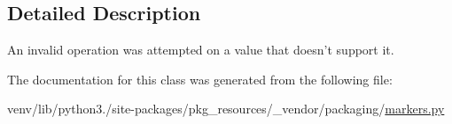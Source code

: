 \subsection{Detailed Description}
\begin{DoxyVerb}An invalid operation was attempted on a value that doesn't support it.
\end{DoxyVerb}
 

The documentation for this class was generated from the following file\+:\begin{DoxyCompactItemize}
\item 
venv/lib/python3./site-\/packages/pkg\+\_\+resources/\+\_\+vendor/packaging/\hyperlink{pkg__resources_2__vendor_2packaging_2markers_8py}{markers.\+py}\end{DoxyCompactItemize}
